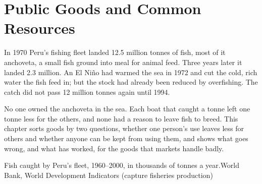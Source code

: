 \chapter{Public Goods and Common Resources}\label{ch:g11:public-goods-and-commons}

In 1970 Peru's fishing fleet landed 12.5 million tonnes of fish, most of it anchoveta, a small fish ground into meal for animal feed.
Three years later it landed 2.3 million. An El Niño had warmed the sea in 1972 and cut the cold, rich water the fish feed in; but the stock had already been reduced
by overfishing. The catch did not pass 12 million tonnes again until 1994.

No one owned the anchoveta in the sea. Each boat that caught a tonne left one tonne less for the others, and none had a reason to leave fish to breed. This chapter
sorts goods by two questions, whether one person's use leaves less for others and whether anyone can be kept from using them, and shows what goes wrong, and what has
worked, for the goods that markets handle badly.

\begin{openingchart}{Fish caught by Peru's fleet, 1960--2000, in thousands of tonnes a year.}{World Bank, World Development Indicators (capture fisheries production)}
\end{openingchart}


